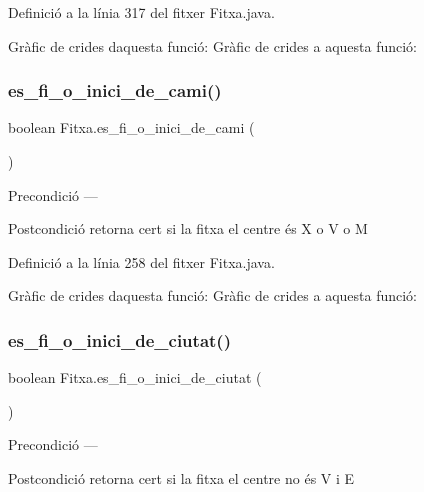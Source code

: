 Definició a la línia 317 del fitxer Fitxa.\+java.

Gràfic de crides d\textquotesingle{}aquesta funció\+:
Gràfic de crides a aquesta funció\+:
\mbox{\label{class_fitxa_a93e5e168dbfe15afb009c0fbfdc1554a}} 
\subsubsection{\texorpdfstring{es\+\_\+fi\+\_\+o\+\_\+inici\+\_\+de\+\_\+cami()}{es\_fi\_o\_inici\_de\_cami()}}
{\footnotesize\ttfamily boolean Fitxa.\+es\+\_\+fi\+\_\+o\+\_\+inici\+\_\+de\+\_\+cami (\begin{DoxyParamCaption}{ }\end{DoxyParamCaption})}

\begin{DoxyPrecond}{Precondició}
--- 
\end{DoxyPrecond}
\begin{DoxyPostcond}{Postcondició}
retorna cert si la fitxa el centre és X o V o M 
\end{DoxyPostcond}


Definició a la línia 258 del fitxer Fitxa.\+java.

Gràfic de crides d\textquotesingle{}aquesta funció\+:
Gràfic de crides a aquesta funció\+:
\mbox{\label{class_fitxa_aa8a2753d03291193ef0bb30b5b8839a9}} 
\subsubsection{\texorpdfstring{es\+\_\+fi\+\_\+o\+\_\+inici\+\_\+de\+\_\+ciutat()}{es\_fi\_o\_inici\_de\_ciutat()}}
{\footnotesize\ttfamily boolean Fitxa.\+es\+\_\+fi\+\_\+o\+\_\+inici\+\_\+de\+\_\+ciutat (\begin{DoxyParamCaption}{ }\end{DoxyParamCaption})}

\begin{DoxyPrecond}{Precondició}
--- 
\end{DoxyPrecond}
\begin{DoxyPostcond}{Postcondició}
retorna cert si la fitxa el centre no és V i E 
\end{DoxyPostcond}


